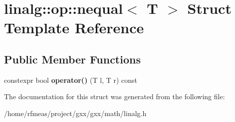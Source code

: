 \hypertarget{structlinalg_1_1op_1_1nequal}{}\section{linalg\+:\+:op\+:\+:nequal$<$ T $>$ Struct Template Reference}
\label{structlinalg_1_1op_1_1nequal}
\subsection*{Public Member Functions}
\begin{DoxyCompactItemize}
\item 
constexpr bool {\bfseries operator()} (T l, T r) const \hypertarget{structlinalg_1_1op_1_1nequal_a04872de1faf9c6a00f479eb87d3002e8}{}\label{structlinalg_1_1op_1_1nequal_a04872de1faf9c6a00f479eb87d3002e8}

\end{DoxyCompactItemize}


The documentation for this struct was generated from the following file\+:\begin{DoxyCompactItemize}
\item 
/home/rfmeas/project/gxx/gxx/math/linalg.\+h\end{DoxyCompactItemize}
